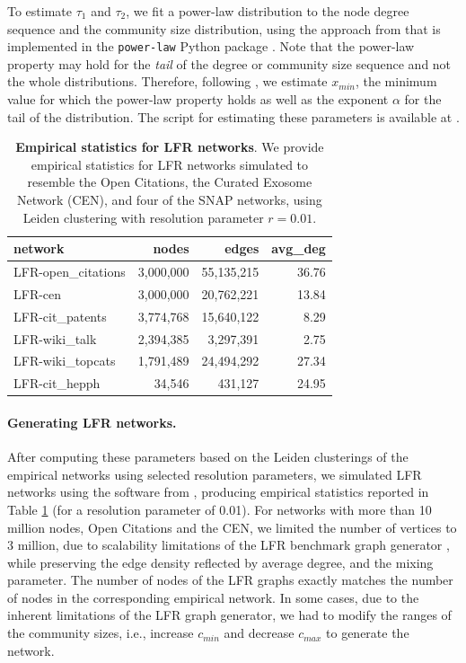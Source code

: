 \documentclass[11pt]{article}   	%
\begin{document}
To estimate $\tau_1$ and $\tau_2$, we fit a power-law distribution to the node degree sequence and the community size distribution, using the approach from \cite{clauset2009power} that is implemented in the \texttt{power-law} Python package \citep{alstott2014powerlaw}. Note that the power-law property may hold for the \textit{tail} of the degree or community size sequence and not the whole distributions. Therefore, following \cite{clauset2009power}, we estimate $x_{min}$, the minimum value for which the power-law property holds as well as the exponent $\alpha$ for the tail of the distribution. The script for estimating these parameters is available at \cite{analysis_scripts}.

\begin{table}[ht]
\centering
\begin{tabular}{lrrr}
  \hline
 network & nodes & edges & avg\_deg \\
  \hline
    LFR-open\_citations & 3,000,000  & 55,135,215 & 36.76 \\
    LFR-cen & 3,000,000 & 20,762,221 & 13.84 \\
    LFR-cit\_patents & 3,774,768 & 15,640,122 & 8.29 \\
    LFR-wiki\_talk & 2,394,385 & 3,297,391 & 2.75 \\
    LFR-wiki\_topcats & 1,791,489 & 24,494,292 & 27.34 \\
    LFR-cit\_hepph &  34,546 & 431,127 & 24.95 \\
 \hline
\end{tabular}
\caption{\textbf{Empirical statistics for LFR networks}. We provide empirical statistics for LFR networks simulated to  resemble the Open Citations, the Curated Exosome Network (CEN), and four of the SNAP networks, using Leiden clustering with resolution parameter $r=0.01$. }
\label{tab:empirical-stats-LFR}
\end{table}

\paragraph{Generating LFR networks.}
After computing these parameters based on the Leiden clusterings of the empirical networks using selected resolution parameters, we simulated LFR networks using the software from \cite{lancichinetti2008benchmark}, producing empirical statistics reported in Table \ref{tab:empirical-stats-LFR} (for a resolution parameter of 0.01). For networks with more than 10 million nodes, Open Citations and the CEN, we limited the number of vertices to 3 million, due to scalability limitations of  the LFR benchmark graph generator \citep{slota2019scalable}, while preserving the edge density reflected by average degree, and the mixing parameter.  The number of nodes of the LFR graphs exactly matches the number of nodes in the corresponding empirical network. In some cases, due to the inherent limitations of the LFR graph generator, we had to modify the ranges of the community sizes, i.e., increase $c_{min}$ and decrease $c_{max}$ to generate the network.
\end{document}
